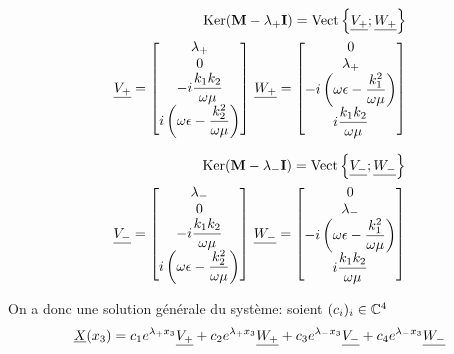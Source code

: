     \begin{align}
    \operatorname{Ker}(\mathbf{M}-\lambda_+\mathbf{I})=\operatorname{Vect}\left\lbrace\underline{V_+};\underline{W_+}\right\rbrace \\
        \underline{V_+} = 
        \begin{bmatrix}
        \lambda_+ \\
            0 \\
            -i\dfrac{k_1k_2}{\omega\mu} \\
            i\left(\omega\epsilon - \dfrac{k_2^2}{\omega\mu}\right) \\
        \end{bmatrix}
        \,
        \underline{W_+} = 
            \begin{bmatrix}
            0 \\
            \lambda_+ \\
            -i\left(\omega\epsilon - \dfrac{k_1^2}{\omega\mu}\right) \\
            i\dfrac{k_1k_2}{\omega\mu} \\
        \end{bmatrix}
    \end{align}

    \begin{align}
    \operatorname{Ker}(\mathbf{M}-\lambda_-\mathbf{I})=\operatorname{Vect}\left\lbrace\underline{V_-};\underline{W_-}\right\rbrace\\
        \underline{V_-} = 
        \begin{bmatrix}
            \lambda_- \\
            0 \\
            -i\dfrac{k_1k_2}{\omega\mu} \\
            i\left(\omega\epsilon - \dfrac{k_2^2}{\omega\mu}\right) \\
        \end{bmatrix}
        \,
        \underline{W_-} = 
        \begin{bmatrix}
            0 \\
            \lambda_- \\
            -i\left(\omega\epsilon - \dfrac{k_1^2}{\omega\mu}\right) \\
            i\dfrac{k_1k_2}{\omega\mu} \\
        \end{bmatrix}
    \end{align}

    On a donc une solution générale du système: soient $(c_i)_{i} \in \mathbb C^4$
    \begin{equation}
        \underline{X}(x_3) = c_1e^{\lambda_+ x_3}\underline{V_+}  + c_2e^{\lambda_+ x_3}\underline{W_+} + c_3e^{\lambda_- x_3}\underline{V_-} +c_4e^{\lambda_- x_3}\underline{W_-}
    \end{equation}

